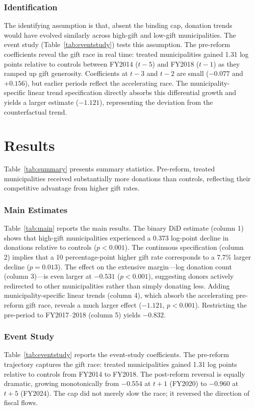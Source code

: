 \documentclass[12pt]{article}
\begin{document}
\subsubsection*{Identification} The identifying assumption is that, absent the binding cap, donation trends would have evolved similarly across high-gift and low-gift municipalities. The event study (Table~\ref{tab:eventstudy}) tests this assumption. The pre-reform coefficients reveal the gift race in real time: treated municipalities gained 1.31 log points relative to controls between FY2014 ($t{-}5$) and FY2018 ($t{-}1$) as they ramped up gift generosity. Coefficients at $t{-}3$ and $t{-}2$ are small ($-0.077$ and $+0.156$), but earlier periods reflect the accelerating race. The municipality-specific linear trend specification directly absorbs this differential growth and yields a larger estimate ($-1.121$), representing the deviation from the counterfactual trend.

\section{Results}

Table~\ref{tab:summary} presents summary statistics. Pre-reform, treated municipalities received substantially more donations than controls, reflecting their competitive advantage from higher gift rates.

\subsubsection*{Main Estimates} Table~\ref{tab:main} reports the main results. The binary DiD estimate (column 1) shows that high-gift municipalities experienced a 0.373 log-point decline in donations relative to controls ($p < 0.001$). The continuous specification (column 2) implies that a 10 percentage-point higher gift rate corresponds to a 7.7\% larger decline ($p = 0.013$). The effect on the extensive margin---log donation count (column 3)---is even larger at $-0.531$ ($p < 0.001$), suggesting donors actively redirected to other municipalities rather than simply donating less. Adding municipality-specific linear trends (column 4), which absorb the accelerating pre-reform gift race, reveals a much larger effect ($-1.121$, $p < 0.001$). Restricting the pre-period to FY2017--2018 (column 5) yields $-0.832$.

\subsubsection*{Event Study} Table~\ref{tab:eventstudy} reports the event-study coefficients. The pre-reform trajectory captures the gift race: treated municipalities gained 1.31 log points relative to controls from FY2014 to FY2018. The post-reform reversal is equally dramatic, growing monotonically from $-0.554$ at $t{+}1$ (FY2020) to $-0.960$ at $t{+}5$ (FY2024). The cap did not merely slow the race; it reversed the direction of fiscal flows.
\end{document}
